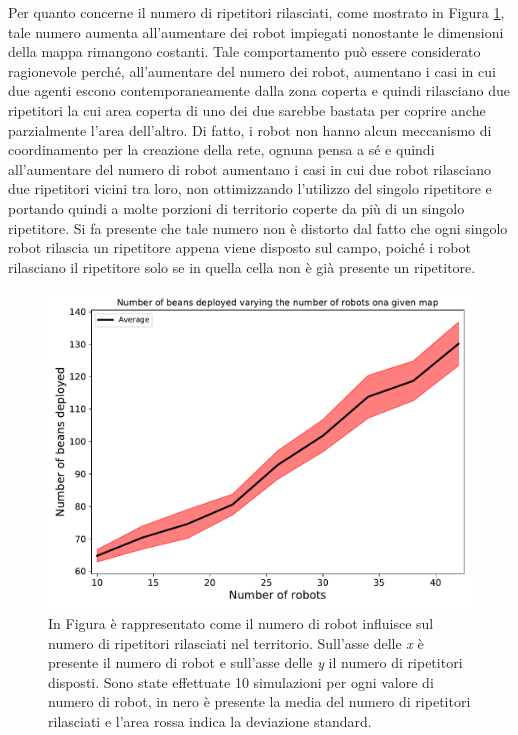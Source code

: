 Per quanto concerne il numero di ripetitori rilasciati, come mostrato in Figura \ref{fig:robotsbeans}, tale numero aumenta all'aumentare dei robot impiegati nonostante le dimensioni della mappa rimangono costanti.
Tale comportamento può essere considerato ragionevole perché, all'aumentare del numero dei robot, aumentano i casi in cui due agenti escono contemporaneamente dalla zona coperta e quindi rilasciano due ripetitori la cui area coperta di uno dei due sarebbe bastata per coprire anche parzialmente l'area dell'altro.
Di fatto, i robot non hanno alcun meccanismo di coordinamento per la creazione della rete, ognuna pensa a sé e quindi all'aumentare del numero di robot aumentano i casi in cui due robot rilasciano due ripetitori vicini tra loro, non ottimizzando l'utilizzo del singolo ripetitore e portando quindi a molte porzioni di territorio coperte da più di un singolo ripetitore.
Si fa presente che tale numero non è distorto dal fatto che ogni singolo robot rilascia un ripetitore appena viene disposto sul campo, poiché i robot rilasciano il ripetitore solo se in quella cella non è già presente un ripetitore.
\begin{figure}
	\centering
	\includegraphics[width=0.9\linewidth]{images/macro_results/robots_beans}
	\caption{In Figura è rappresentato come il numero di robot influisce sul numero di ripetitori rilasciati nel territorio. Sull'asse delle \textit{x} è presente il numero di robot e sull'asse delle \textit{y} il numero di ripetitori disposti. Sono state effettuate 10 simulazioni per ogni valore di numero di robot, in nero è presente la media del numero di ripetitori rilasciati e l'area rossa indica la deviazione standard.}
	\label{fig:robotsbeans}
\end{figure}

